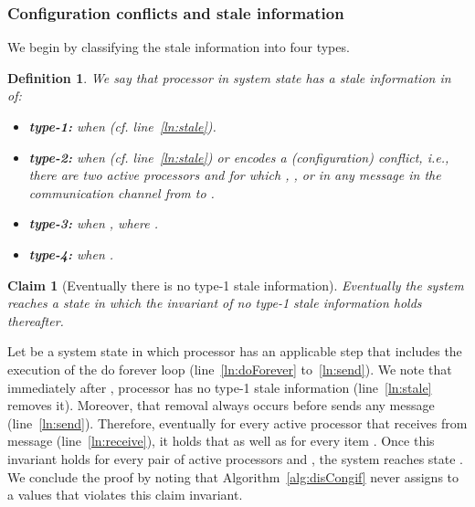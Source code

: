 \documentclass[11pt]{article}
\newtheorem{claim}[theorem]{Claim}
\newtheorem{definition}{Definition}[section]
\newenvironment{proof}{\noindent{\bf Proof.}}{\hfill}
\begin{document}
\subsubsection*{Configuration conflicts and stale information}


We begin by classifying the stale information into four types. 


\begin{definition}
\label{def:type}
We say that processor  in system state  has a stale information in  of:
\begin{itemize}[topsep=2pt,itemsep=-.5ex,partopsep=.5ex,parsep=1ex,leftmargin=.5cm]
	\item[]{\bf type-1:} when 
 (cf. line~\ref{ln:stale}). 
	\item[]{\bf type-2:} when  (cf. line~\ref{ln:stale}) or  encodes a \emph{(configuration) conflict}, i.e., there are two active processors  and  for which , , or  in any message in the communication channel from  to .
\item[]{\bf type-3:} when , where  . 
	\item[]{\bf type-4:} when .
\end{itemize}
\end{definition} 








\begin{claim}[Eventually there is no type-1 stale information]
\label{thm:noStale}
Eventually the system reaches a state  in which the invariant of no type-1 stale information holds thereafter.
\end{claim}
\begin{proof}
Let  be a system state in which processor  has an applicable step  that includes the execution of the do forever loop (line~\ref{ln:doForever} to~\ref{ln:send}).
We note that immediately after , processor  has no type-1 stale information (line~\ref{ln:stale} removes it). Moreover, that removal always occurs before  sends any message  (line~\ref{ln:send}). Therefore, eventually for every active processor  that receives from  message  (line~\ref{ln:receive}), it holds that  as well as for every item . Once this invariant holds for every pair of active processors  and , the system reaches state . We conclude the proof by noting that Algorithm~\ref{alg:disCongif} never assigns to  a values that violates this claim invariant.    
\end{proof}
\end{document}
